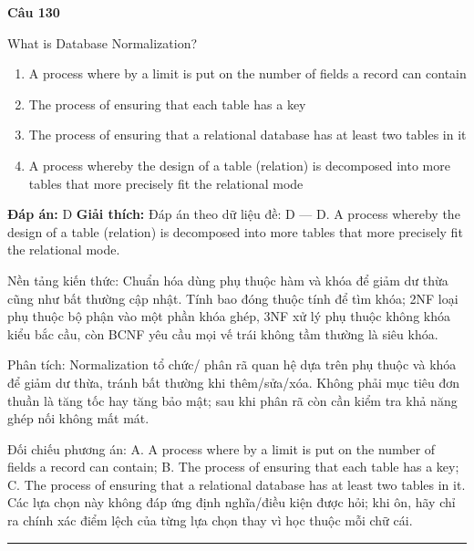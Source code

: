 \documentclass[11pt,a4paper]{article}
\newenvironment{question}[1]{%
  \par\vspace{1em}\noindent\textbf{\large Câu #1}\par\vspace{0.4em}
}{%
  \par\vspace{1em}\hrule\vspace{0.6em}
}
\newenvironment{choices}{%
  \begin{enumerate}[label=\textbf{\Alph*.},leftmargin=2.2em,itemsep=2pt,topsep=3pt]
}{%
  \end{enumerate}
}
\newcommand{\choice}{\item}
\begin{document}
\begin{question}{130}
What is Database Normalization?
\begin{choices}
\choice A process where by a limit is put on the number of fields a record can contain
\choice The process of ensuring that each table has a key
\choice The process of ensuring that a relational database has at least two tables in it
\choice A process whereby the design of a table (relation) is decomposed into more tables that more precisely fit the relational mode
\end{choices}
\textbf{Đáp án:} D
\textbf{Giải thích:} Đáp án theo dữ liệu đề: D — D. A process whereby the design of a table (relation) is decomposed into more tables that more precisely fit the relational mode.

Nền tảng kiến thức: Chuẩn hóa dùng phụ thuộc hàm và khóa để giảm dư thừa cũng như bất thường cập nhật. Tính bao đóng thuộc tính để tìm khóa; 2NF loại phụ thuộc bộ phận vào một phần khóa ghép, 3NF xử lý phụ thuộc không khóa kiểu bắc cầu, còn BCNF yêu cầu mọi vế trái không tầm thường là siêu khóa.

Phân tích: Normalization tổ chức/ phân rã quan hệ dựa trên phụ thuộc và khóa để giảm dư thừa, tránh bất thường khi thêm/sửa/xóa. Không phải mục tiêu đơn thuần là tăng tốc hay tăng bảo mật; sau khi phân rã còn cần kiểm tra khả năng ghép nối không mất mát.

Đối chiếu phương án: A. A process where by a limit is put on the number of fields a record can contain; B. The process of ensuring that each table has a key; C. The process of ensuring that a relational database has at least two tables in it. Các lựa chọn này không đáp ứng định nghĩa/điều kiện được hỏi; khi ôn, hãy chỉ ra chính xác điểm lệch của từng lựa chọn thay vì học thuộc mỗi chữ cái.
\end{question}
\end{document}
